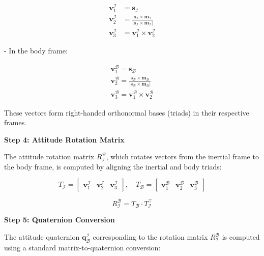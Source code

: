 \begin{align}
    \mathbf{v}_1^{\mathcal{I}} &= \mathbf{s}_{\mathcal{I}} \\
    \mathbf{v}_2^{\mathcal{I}} &= \frac{\mathbf{s}_{\mathcal{I}} \times \mathbf{m}_{\mathcal{I}}}{|\mathbf{s}_{\mathcal{I}} \times \mathbf{m}_{\mathcal{I}}|} \\
    \mathbf{v}_3^{\mathcal{I}} &= \mathbf{v}_1^{\mathcal{I}} \times \mathbf{v}_2^{\mathcal{I}}
\end{align}

- In the body frame:

\begin{align}
    \mathbf{v}_1^{\mathcal{B}} = \mathbf{s}_{\mathcal{B}} \\
    \mathbf{v}_2^{\mathcal{B}} = \frac{\mathbf{s}_{\mathcal{B}} \times \mathbf{m}_{\mathcal{B}}}{|\mathbf{s}_{\mathcal{B}} \times \mathbf{m}_{\mathcal{B}}|} \\
    \mathbf{v}_3^{\mathcal{B}} = \mathbf{v}_1^{\mathcal{B}} \times \mathbf{v}_2^{\mathcal{B}}
\end{align}

These vectors form right-handed orthonormal bases (triads) in their respective frames.

\textbf{Step 4: Attitude Rotation Matrix}

The attitude rotation matrix $R_{\mathcal{I}}^{\mathcal{B}}$, which rotates vectors from the inertial frame to the body frame, is computed by aligning the inertial and body triads:

\begin{equation}
    T_{\mathcal{I}} = \begin{bmatrix} \mathbf{v}_1^{\mathcal{I}} & \mathbf{v}_2^{\mathcal{I}} & \mathbf{v}_3^{\mathcal{I}} \end{bmatrix}, \quad
    T_{\mathcal{B}} = \begin{bmatrix} \mathbf{v}_1^{\mathcal{B}} & \mathbf{v}_2^{\mathcal{B}} & \mathbf{v}_3^{\mathcal{B}} \end{bmatrix}
\end{equation}

\begin{equation}
    R_{\mathcal{I}}^{\mathcal{B}} = T_{\mathcal{B}} \cdot T_{\mathcal{I}}^\top
\end{equation}

\textbf{Step 5: Quaternion Conversion}

The attitude quaternion $\mathbf{q}_{\mathcal{B}}^{\mathcal{I}}$ corresponding to the rotation matrix $R_{\mathcal{I}}^{\mathcal{B}}$ is computed using a standard matrix-to-quaternion conversion:

